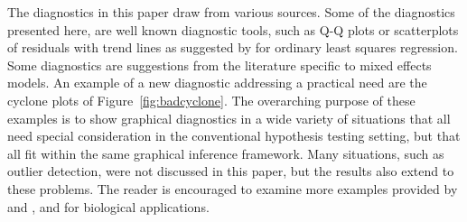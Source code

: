 \documentclass[12pt]{article}
\newcommand{\hh}[1]{{\color{orange} #1}}
\newcommand{\alnote}[1]{\todo[inline,color=green!40]{#1}} %
\newcommand{\hhnote}[1]{\todo[inline,color=orange!40]{#1}}
\begin{document}

The diagnostics in this paper draw from various sources. Some of the diagnostics presented here, are well known diagnostic  tools, such as Q-Q plots or  scatterplots of residuals with trend lines as suggested by \citet{Cook:1999} for ordinary least squares regression. Some diagnostics are suggestions from the literature specific to mixed effects models. An example of a new diagnostic addressing a  practical need are the cyclone plots of Figure~\ref{fig:badcyclone}. The overarching purpose of  these examples is to show graphical diagnostics in a wide variety of situations that all need special consideration in the conventional hypothesis testing setting, but that all fit within the same graphical inference framework.  Many situations, such as outlier detection, were not discussed in this paper, but the results also extend to these problems. The reader is encouraged to examine more examples provided by \citet{Buja:2009hp} and \citet{mahbub:2013}, and \citet{RoyChowdhury:2014} for biological applications.





  

\end{document}
